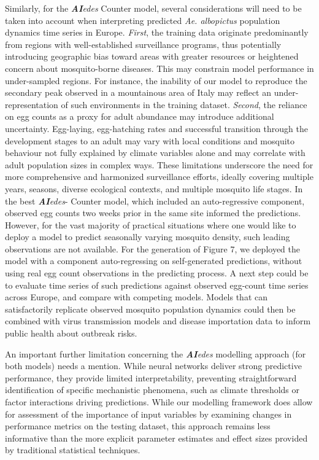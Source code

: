 \documentclass[preprint,12pt]{elsarticle}
\begin{document}
Similarly, for the \textit{\textbf{AI}edes} Counter model, several considerations will need to be taken into account when interpreting predicted \textit{Ae. albopictus} population dynamics time series in Europe.
\textit{First}, the training data originate predominantly from regions with well-established surveillance programs, thus potentially introducing geographic bias toward areas with greater resources or heightened concern about mosquito-borne diseases. This may constrain model performance in under-sampled regions. For instance, the inability of our model to reproduce the secondary peak observed in a mountainous area of Italy may reflect an under-representation of such environments in the training dataset. 
\textit{Second}, the reliance on egg counts as a proxy for adult abundance may introduce additional uncertainty. Egg-laying, egg-hatching rates and successful transition through the development stages to an adult may vary with local conditions and mosquito behaviour not fully explained by climate variables alone and may correlate with adult population sizes in complex ways. These limitations underscore the need for more comprehensive and harmonized surveillance efforts, ideally covering multiple years, seasons, diverse ecological contexts, and multiple mosquito life stages.
In the best  \textit{\textbf{AI}edes}- Counter model, which included an auto-regressive component, observed egg counts two weeks prior in the same site informed the predictions. However, for the vast majority of practical situations where one would like to deploy a model to predict seasonally varying mosquito density, such leading observations are not available. For the generation of Figure 7, we deployed the model with a component auto-regressing on self-generated predictions, without using real egg count observations in the predicting process. A next step could be to evaluate time series of such predictions against  observed egg-count time series across Europe, and compare with competing models.
Models that can satisfactorily replicate observed mosquito population dynamics could then be combined with virus transmission models and disease importation data to inform public health about outbreak risks. 

An important further limitation concerning the \textit{\textbf{AI}edes} modelling approach (for both models) needs a mention. While neural networks deliver strong predictive performance, they provide limited interpretability, preventing straightforward identification of specific mechanistic phenomena, such as climate thresholds or factor interactions driving predictions. While our modelling framework does allow for assessment of the importance of input variables by examining changes in performance metrics on the testing dataset, this approach remains less informative than the more explicit parameter estimates and effect sizes provided by traditional statistical techniques.
\end{document}
